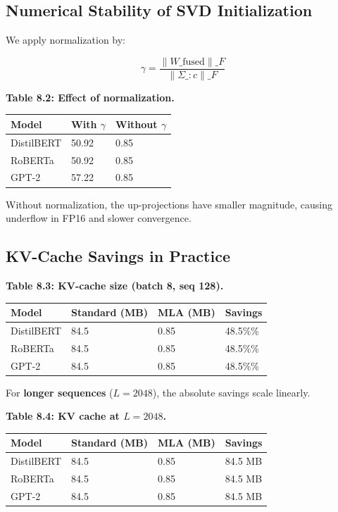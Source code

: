 \subsection{Numerical Stability of SVD Initialization}

We apply normalization by:

\[
\gamma = \frac{\|W\_\text{fused}\|\_F}{\|\Sigma\_{:c}\|\_F}
\tag{8.1}
\]

\textbf{Table 8.2: Effect of normalization.}

\begin{table}[H]
\centering
\small
\begin{tabular}{lll}
\toprule
\textbf{Model} & \textbf{With $\gamma$} & \textbf{Without $\gamma$} \\
\midrule
DistilBERT & 50.92 & 0.85 \\
RoBERTa & 50.92 & 0.85 \\
GPT-2 & 57.22 & 0.85 \\
\bottomrule
\end{tabular}
\end{table}

Without normalization, the up-projections have smaller magnitude, causing 
underflow in FP16 and slower convergence.

\subsection{KV-Cache Savings in Practice}

\textbf{Table 8.3: KV-cache size (batch 8, seq 128).}

\begin{table}[H]
\centering
\small
\begin{tabular}{llll}
\toprule
\textbf{Model} & \textbf{Standard (MB)} & \textbf{MLA (MB)} & \textbf{Savings} \\
\midrule
DistilBERT & 84.5 & 0.85 & 48.5\%\% \\
RoBERTa & 84.5 & 0.85 & 48.5\%\% \\
GPT-2 & 84.5 & 0.85 & 48.5\%\% \\
\bottomrule
\end{tabular}
\end{table}

For \textbf{longer sequences} ($L = 2048$), the absolute savings scale linearly.

\textbf{Table 8.4: KV cache at $L = 2048$.}

\begin{table}[H]
\centering
\small
\begin{tabular}{llll}
\toprule
\textbf{Model} & \textbf{Standard (MB)} & \textbf{MLA (MB)} & \textbf{Savings} \\
\midrule
DistilBERT & 84.5 & 0.85 & 84.5 MB \\
RoBERTa & 84.5 & 0.85 & 84.5 MB \\
GPT-2 & 84.5 & 0.85 & 84.5 MB \\
\bottomrule
\end{tabular}
\end{table}


